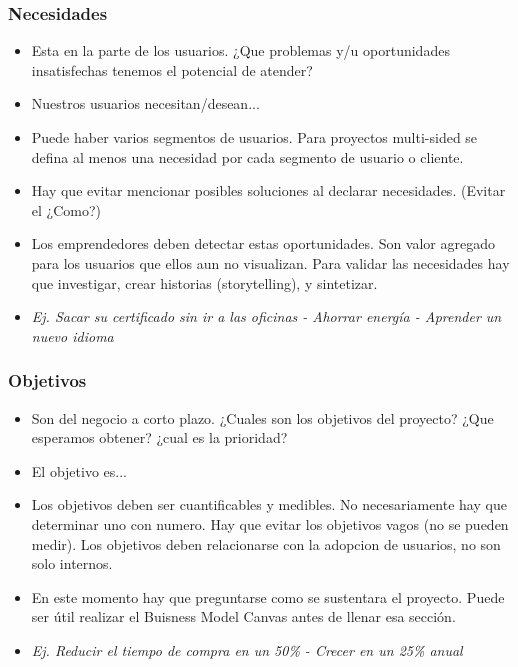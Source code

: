 \documentclass[titlepage,a4paper]{article}
\begin{document}
\subsubsection*{Necesidades}

\begin{itemize}
    \item Esta en la parte de los usuarios. ¿Que problemas y/u oportunidades insatisfechas tenemos el potencial de atender? 
    \item Nuestros usuarios necesitan/desean...
    \item Puede haber varios segmentos de usuarios. Para proyectos multi-sided se defina al menos una necesidad por cada segmento de usuario o cliente.
    \item Hay que evitar mencionar posibles soluciones al declarar necesidades. (Evitar el ¿Como?)
    \item Los emprendedores deben detectar estas oportunidades. Son valor agregado para los usuarios que ellos aun no visualizan. Para validar las necesidades hay que investigar, crear historias (storytelling), y sintetizar.
    \item \textit{Ej. Sacar su certificado sin ir a las oficinas - Ahorrar energía - Aprender un nuevo idioma}
\end{itemize}

\subsubsection*{Objetivos}

\begin{itemize}
    \item Son del negocio a corto plazo. ¿Cuales son los objetivos del proyecto? ¿Que esperamos obtener? ¿cual es la prioridad?
    \item El objetivo es...
    \item Los objetivos deben ser cuantificables y medibles. No necesariamente hay que determinar uno con numero. Hay que evitar los objetivos vagos (no se pueden medir). Los objetivos deben relacionarse con la adopcion de usuarios, no son solo internos.
    \item En este momento hay que preguntarse como se sustentara el proyecto. Puede ser útil realizar el Buisness Model Canvas antes de llenar esa sección.
    \item \textit{Ej. Reducir el tiempo de compra en un 50\% - Crecer en un 25\% anual}
\end{itemize}
\end{document}
